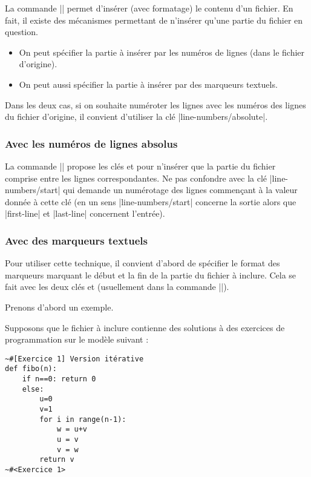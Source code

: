 \documentclass[dvipsnames,svgnames]{article}
\begin{document}
\label{part-of-a-file}


La commande |\PitonInputFile| permet d'insérer (avec formatage) le contenu d'un fichier. En fait, il existe des
mécanismes permettant de n'insérer qu'une partie du fichier en question.
\begin{itemize}
\item On peut spécifier la partie à insérer par les numéros de lignes (dans le fichier d'origine).
\item On peut aussi spécifier la partie à insérer par des marqueurs textuels.
\end{itemize}
Dans les deux cas, si on souhaite numéroter les lignes avec les numéros des lignes du fichier d'origine, il
convient d'utiliser la clé |line-numbers/absolute|.

\subsubsection{Avec les numéros de lignes absolus}

La commande |\PitonInputFile| propose les clés  et  pour n'insérer que
la partie du fichier comprise entre les lignes correspondantes. Ne pas confondre avec la clé |line-numbers/start|
qui demande un numérotage des lignes commençant à la valeur donnée à cette clé (en un sens |line-numbers/start|
concerne la sortie alors que |first-line| et |last-line| concernent l'entrée).


\subsubsection{Avec des marqueurs textuels}



Pour utiliser cette technique, il convient d'abord de spécifier le format des marqueurs marquant le début et la fin
de la partie du fichier à inclure. Cela se fait avec les deux clés  et
 (usuellement dans la commande |\PitonOptions|). 

\medskip
Prenons d'abord un exemple.

\medskip
Supposons que le fichier à inclure contienne des solutions à des exercices de programmation sur le modèle suivant :  

\begin{Verbatim}[formatcom=\small\color{gray}]
~#[Exercice 1] Version itérative
def fibo(n):
    if n==0: return 0 
    else:
        u=0
        v=1
        for i in range(n-1):
            w = u+v
            u = v
            v = w
        return v
~#<Exercice 1>
\end{Verbatim}
\end{document}
